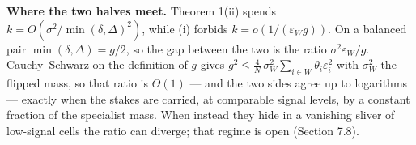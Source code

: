 \textbf{Where the two halves meet.} Theorem 1(ii) spends
\(k=O(\sigma^2/\min(\delta,\Delta)^2)\), while (i) forbids
\(k=o(1/(\varepsilon_W g))\). On a balanced pair
\(\min(\delta,\Delta)=g/2\), so the gap between the two is the ratio
\(\sigma^2\varepsilon_W/g\). Cauchy--Schwarz on the definition of \(g\)
gives
\(g^2 \le \tfrac4N\,\sigma_W^2\sum_{i\in W}\theta_i\varepsilon_i^2\)
with \(\sigma_W^2\) the flipped mass, so that ratio is \(\Theta(1)\) ---
and the two sides agree up to logarithms --- exactly when the stakes are
carried, at comparable signal levels, by a constant fraction of the
specialist mass. When instead they hide in a vanishing sliver of
low-signal cells the ratio can diverge; that regime is open (Section
7.8).
